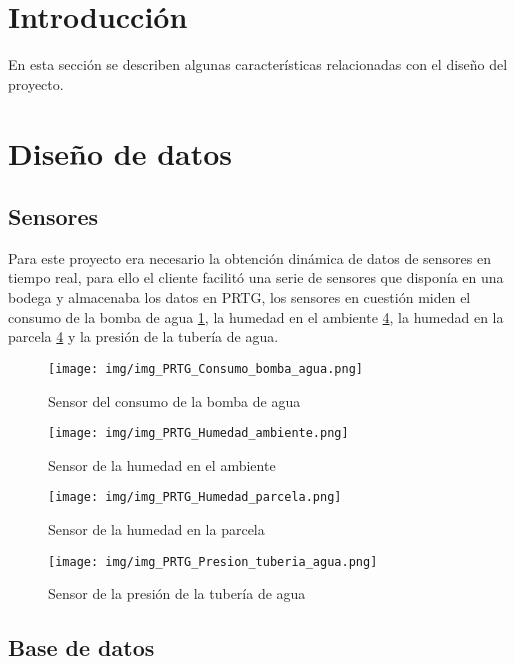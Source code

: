 
\section{Introducción}
En esta sección se describen algunas características relacionadas con el diseño del proyecto.

\section{Diseño de datos}

\subsection{Sensores}
Para este proyecto era necesario la obtención dinámica de datos de sensores en tiempo real, para ello el cliente facilitó una serie de sensores que disponía en una bodega y almacenaba los datos en PRTG, los sensores en cuestión miden el consumo de la bomba de agua \ref{img_Consumo_Bomba_Agua}, la humedad en el ambiente \ref{img_Presion_Tuberia_Agua_PRTG}, la humedad en la parcela \ref{img_Presion_Tuberia_Agua_PRTG} y la presión de la tubería de agua.

\begin{figure}[h]
	\centering
	\texttt{[image: img/img\_PRTG\_Consumo\_bomba\_agua.png]}
	\caption{Sensor del consumo de la bomba de agua}
	\label{img_Consumo_Bomba_Agua}
\end{figure}

\begin{figure}[h]
	\centering
	\texttt{[image: img/img\_PRTG\_Humedad\_ambiente.png]}
	\caption{Sensor de la humedad en el ambiente}
	\label{mg_Humedad_Ambiente_PRTG}
\end{figure}

\begin{figure}[h]
	\centering
	\texttt{[image: img/img\_PRTG\_Humedad\_parcela.png]}
	\caption{Sensor de la humedad en la parcela}
	\label{img_Humedad_Parcela_PRTG}
\end{figure}

\begin{figure}[h]
	\centering
	\texttt{[image: img/img\_PRTG\_Presion\_tuberia\_agua.png]}
	\caption{Sensor de la presión de la tubería de agua}
	\label{img_Presion_Tuberia_Agua_PRTG}
\end{figure}

\newpage
\subsection{Base de datos}

